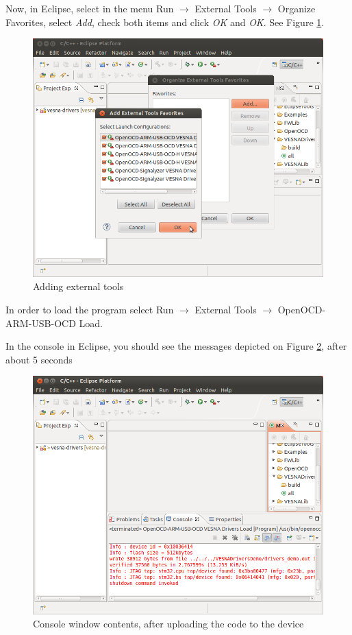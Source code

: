 \documentclass[a4paper, 10pt]{article}
\begin{document}
Now, in Eclipse, select
in the menu
Run $\rightarrow$ External Tools $\rightarrow$ Organize Favorites,
select \emph{Add}, check both items and click \emph{OK} and \emph{OK}.
See Figure \ref{fig:compile-external-tools}.

    \begin{figure}[H]
    \centering
        \includegraphics[width=\textwidth]{./install-guide-linux-images/compile-external-tools.png}
        \caption{Adding external tools}
        \label{fig:compile-external-tools}
    \end{figure}

In order to load the program select
Run $\rightarrow$ External Tools $\rightarrow$ OpenOCD-ARM-USB-OCD Load.

In the console in Eclipse, you should see the messages depicted on
Figure \ref{fig:load-successful},
after about 5 seconds


    \begin{figure}[H]
    \centering
        \includegraphics[width=\textwidth]{./install-guide-linux-images/load-successful.png}
        \caption{Console window contents, after uploading the code to the device}
        \label{fig:load-successful}
    \end{figure}
\end{document}
